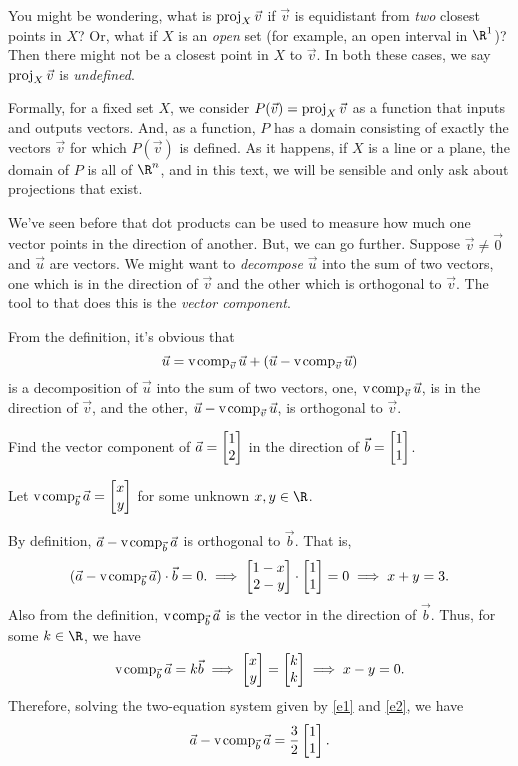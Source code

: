 You might be wondering, what is $\operatorname{proj}_X\vec v$ if $\vec v$ is equidistant from \emph{two}
closest points in $X$? Or, what if $X$ is an \emph{open} set (for example, an open interval in $\R^1$)?
Then there might not be a closest point in $X$ to $\vec v$. In both these cases, we say $\operatorname{proj}_X\vec v$
is \emph{undefined}.

Formally, for a fixed set $X$, we consider $P(\vec v)=\operatorname{proj}_X\vec v$ as a function that inputs and outputs
vectors. And, as a function, $P$ has a domain consisting of exactly the vectors $\vec v$ for which $P(\vec v)$
is defined. As it happens, if $X$ is a line or a plane, the domain of $P$ is all of $\R^n$, and in this text,
we will be sensible and only ask about projections that exist. 


We've seen before that dot products can be used to measure how much one
vector points in the direction of another. But, we can go further. Suppose 
$\vec v\neq \vec 0$ and $\vec u$ are vectors. We might want to \emph{decompose}
$\vec u$ into the sum of two vectors, one which is in the direction of $\vec v$
and the other which is orthogonal to $\vec v$. The tool to that does this is the \emph{vector component}.


From the definition, it's obvious that
\[
	\vec u=\operatorname{v\hspace{1pt}comp}_{\vec v}\vec u + (\vec u-\operatorname{v\hspace{1pt}comp}_{\vec v}\vec u)
\]
is a decomposition of $\vec u$ into the sum of two vectors, one, $\operatorname{v\hspace{1pt}comp}_{\vec v}\vec u$, is in the direction of $\vec v$,
and the other, $\vec u-\operatorname{v\hspace{1pt}comp}_{\vec v}\vec u$, is orthogonal to $\vec v$.

\begin{example}
	Find the vector component of $\vec a=\mat{1\\2}$ in the direction of $\vec b=\mat{1\\1}$.

    Let $\Vcomp_{\vec b}\vec a=\mat{x\\y}$ for some unknown $x,y\in\R$. 
    
    By definition, $\vec a - \operatorname{v\hspace{1pt}comp}_{\vec b}\vec a$ is orthogonal to $\vec b$. That is,
    \begin{equation}
    \label{e1}
        (\vec a-\Vcomp_{\vec b}\vec a)\cdot\vec b=0. \implies \mat{1-x\\2-y}\cdot\mat{1\\1} = 0 \implies x+y=3.
    \end{equation}
    Also from the definition, $\operatorname{v\hspace{1pt}comp}_{\vec b}\vec a$ is the vector in the direction of $\vec b$. Thus, for some $k\in\R$, we have
    \begin{equation}
    \label{e2}
        \Vcomp_{\vec b}\vec a = k\vec b \implies\mat{x\\y}=\mat{k\\k}\implies x-y=0.
    \end{equation}
    Therefore, solving the two-equation system given by \eqref{e1} and \eqref{e2}, we have
    \[
        \vec a-\Vcomp_{\vec b}\vec a=\frac{3}{2}\mat{1\\1}.
    \]
\end{example}

